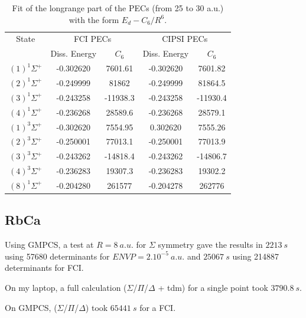 \documentclass[a4paper,10pt]{article}
\begin{document}
\begin{table}[htbp]
  \begin{center}
 \begin{tabular}{|c|c|c|c|c|}
 \hline
State &\multicolumn{2}{|c|}{FCI PECs} & \multicolumn{2}{|c|}{CIPSI PECs} \\
& Diss. Energy &  $C_6$ & Diss. Energy &  $C_6$ \\
 \hline
$(1)^1\Sigma^+$ & -0.302620 & 7601.61 & -0.302620 & 7601.82 \\
$(2)^1\Sigma^+$ & -0.249999 & 81862 & -0.249999 & 81864.5 \\
$(3)^1\Sigma^+$ & -0.243258 & -11938.3 & -0.243258 & -11930.4 \\
$(4)^1\Sigma^+$ & -0.236268 & 28589.6 & -0.236268 & 28579.1 \\
$(1)^3\Sigma^+$ & -0.302620 & 7554.95 & 0.302620 & 7555.26 \\
$(2)^3\Sigma^+$ & -0.250001 & 77013.1 & -0.250001 & 77013.9 \\
$(3)^3\Sigma^+$ & -0.243262 & -14818.4 & -0.243262 & -14806.7 \\
$(4)^3\Sigma^+$ & -0.236283 & 19307.3 & -0.236283 & 19302.2 \\
$(8)^1\Sigma^+$ & -0.204280 & 261577 & -0.204278 & 262776 \\
 \hline
 \end{tabular}
 \caption{\label{londonv154} \small Fit of the longrange part of the PECs (from 25 to 30 a.u.) with the form $E_d - C_6/R^6$. } 
 \end{center}
\end{table}

\pagebreak

\subsection{RbCa}

Using GMPCS, a test at $R=8~a.u.$ for $\Sigma$ symmetry gave the results in $2213~s$ using 57680 determinants for $ENVP=2.10^{-5}~a.u.$ and $25067~s$ using 214887 determinants for FCI.

On my laptop, a full calculation ($\Sigma$/$\Pi$/$\Delta$ + tdm) for a single point took $3790.8~s$. 

On GMPCS, ($\Sigma$/$\Pi$/$\Delta$) took $65441~s$ for a FCI.
\end{document}
